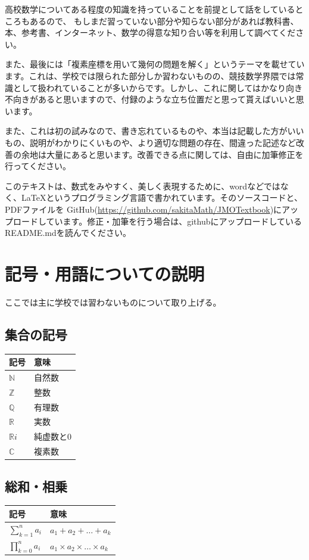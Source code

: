 \documentclass[uplatex,dvipdfmx]{jsbook}
\begin{document}
高校数学についてある程度の知識を持っていることを前提として話をしているところもあるので、
もしまだ習っていない部分や知らない部分があれば教科書、本、参考書、インターネット、数学の得意な知り合い等を利用して調べてください。

また、最後には「複素座標を用いて幾何の問題を解く」というテーマを載せています。これは、学校では限られた部分しか習わないものの、競技数学界隈では常識として扱われていることが多いからです。しかし、これに関してはかなり向き不向きがあると思いますので、付録のような立ち位置だと思って貰えばいいと思います。

また、これは初の試みなので、書き忘れているものや、本当は記載した方がいいもの、説明がわかりにくいものや、より適切な問題の存在、間違った記述など改善の余地は大量にあると思います。改善できる点に関しては、自由に加筆修正を行ってください。

このテキストは、数式をみやすく、美しく表現するために、wordなどではなく、\LaTeX というプログラミング言語で書かれています。そのソースコードと、PDFファイルを
GitHub(\url{https://github.com/sakitaMath/JMOTextbook})にアップロードしています。修正・加筆を行う場合は、githubにアップロードしているREADME.mdを読んでください。

\section{記号・用語についての説明}
ここでは主に学校では習わないものについて取り上げる。
\subsection{集合の記号}
\begin{table}[h]
    \begin{tabular}{l|l}
        記号 & 意味\\\hline\hline
        $\mathbb{N}$ & 自然数\\
        $\mathbb{Z}$ & 整数\\
        $\mathbb{Q}$ & 有理数\\
        $\mathbb{R}$ & 実数\\
        $\mathbb{R}i$ & 純虚数と$0$\\
        $\mathbb{C}$ & 複素数\\\hline
    \end{tabular}
\end{table}

\subsection{総和・相乗}
\begin{table}[h]
    \begin{tabular}{l|l}
        記号 & 意味\\\hline\hline
        $\displaystyle \sum_{k=1}^n a_i$ & $a_1+a_2+\dots +a_k$\\
        $\displaystyle \prod_{k=0}^n a_i$ & $a_1\times a_2\times\dots \times a_k$\\\hline
    \end{tabular}
\end{table}
\end{document}

